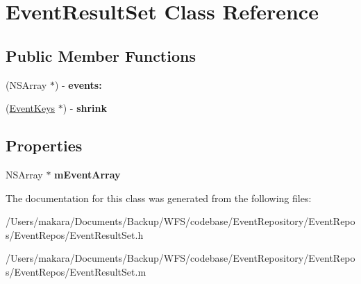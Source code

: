 \hypertarget{interface_event_result_set}{
\section{\-Event\-Result\-Set \-Class \-Reference}
\label{interface_event_result_set}
}
\subsection*{\-Public \-Member \-Functions}
\begin{DoxyCompactItemize}
\item 
\hypertarget{interface_event_result_set_a8a3629f62f35639e95602c1112d9afb5}{
(\-N\-S\-Array $\ast$) -\/ {\bfseries events\-:}}
\label{interface_event_result_set_a8a3629f62f35639e95602c1112d9afb5}

\item 
\hypertarget{interface_event_result_set_a07783be66b157e8aa1496ad76390953a}{
(\hyperlink{interface_event_keys}{\-Event\-Keys} $\ast$) -\/ {\bfseries shrink}}
\label{interface_event_result_set_a07783be66b157e8aa1496ad76390953a}

\end{DoxyCompactItemize}
\subsection*{\-Properties}
\begin{DoxyCompactItemize}
\item 
\hypertarget{interface_event_result_set_a5a1d2bb8916b7a63e7201bf200a196ef}{
\-N\-S\-Array $\ast$ {\bfseries m\-Event\-Array}}
\label{interface_event_result_set_a5a1d2bb8916b7a63e7201bf200a196ef}

\end{DoxyCompactItemize}


\-The documentation for this class was generated from the following files\-:\begin{DoxyCompactItemize}
\item 
/\-Users/makara/\-Documents/\-Backup/\-W\-F\-S/codebase/\-Event\-Repository/\-Event\-Repos/\-Event\-Repos/\-Event\-Result\-Set.\-h\item 
/\-Users/makara/\-Documents/\-Backup/\-W\-F\-S/codebase/\-Event\-Repository/\-Event\-Repos/\-Event\-Repos/\-Event\-Result\-Set.\-m\end{DoxyCompactItemize}
